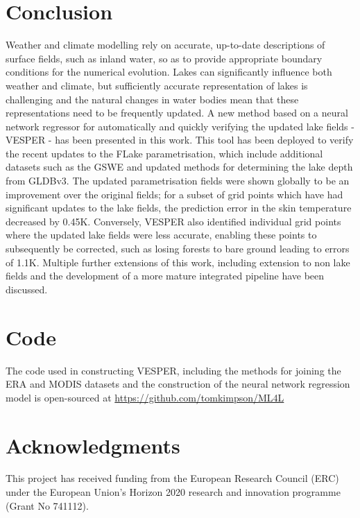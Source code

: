 \documentclass[twocolumn]{article}
\begin{document}
	
	\section{Conclusion}\label{sec:conclusion}
	Weather and climate modelling rely on accurate, up-to-date descriptions of surface fields, such as inland water, so as to provide appropriate boundary conditions for the numerical evolution. Lakes can significantly influence both weather and climate, but sufficiently accurate representation of lakes is challenging and the natural changes in water bodies mean that these representations need to be frequently updated. A new method based on a neural network regressor for automatically and quickly verifying the updated lake fields - VESPER - has been presented in this work. This tool has been deployed to verify the recent updates to the FLake parametrisation, which include additional datasets such as the GSWE and updated methods for determining the lake depth from GLDBv3. The updated parametrisation fields were shown globally to be an improvement over the original fields; for a subset of grid points which have had significant updates to the lake fields, the prediction error in the skin temperature decreased by 0.45K. Conversely, VESPER also identified individual grid points where the updated lake fields were less accurate, enabling these points to subsequently be corrected, such as losing forests to bare ground leading to errors of 1.1K.  Multiple further extensions of this work, including extension to non lake fields and the development of a more mature integrated pipeline have been discussed.
	
	\section{Code}
The code used in constructing VESPER, including the methods for joining the ERA and MODIS datasets and the construction of the neural network regression model is open-sourced at \url{https://github.com/tomkimpson/ML4L}
	
	
	\section{Acknowledgments}
	This project has received funding from the European Research Council (ERC) under the European Union’s Horizon 2020 research and innovation programme (Grant No 741112).
	
	
	
	
\end{document}
